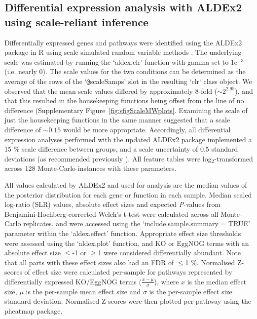 \documentclass[sn-mathphys,Numbered]{sn-jnl}%
\begin{document}
\subsection{Differential expression analysis with ALDEx2 using scale-reliant inference}
Differentially expressed genes and pathways were identified using the ALDEx2 package in R using scale simulated random variable methods \cite{fernandes:2013, gloorScale, nixon2023scale}. The underlying scale was estimated by running the `aldex.clr' function with gamma set to 1e$^{-3}$ (i.e. nearly 0). The scale values for the two conditions can be determined as the average of the rows of the `\texttt{@}scaleSamps' slot in the resulting `clr` class object. We observed that the mean scale values differed by approximately 8-fold ($\sim 2^{2.95}$), and that this resulted in the housekeeping functions being offset from the line of no difference (Supplementary Figure~\ref{fig:sfigScaleMWplots}. Examining the scale of just the housekeeping functions in the same manner suggested that a scale difference of $\sim0.15$ would be more appropriate. Accordingly, all differential expression analyses performed with the updated ALDEx2 package implemented a 15 \% scale difference between groups, and a scale uncertainty of 0.5 standard deviations (as recommended previously \citep{gloorScale, nixon2023scale}). All feature tables were log$_2$-transformed across 128 Monte-Carlo instances with these parameters.

All values calculated by ALDEx2 and used for analysis are the median values of the posterior distribution for each gene or function in each sample. Median scaled log-ratio (SLR) values, absolute effect sizes and expected \textit{P}-values from Benjamini-Hochberg-corrected Welch's t-test were calculated across all Monte-Carlo replicates. and were accessed using the `include.sample.summary = TRUE' parameter within the `aldex.effect' function. Appropriate effect size thresholds were assessed using the `aldex.plot' function, and KO or EggNOG terms with an absolute effect size $\leq$-1 or $\geq$1 were considered differentially abundant. Note that all parts with these effect sizes also had an FDR of $\leq$1 \%. Normalised Z-scores of effect size were calculated per-sample for pathways represented by differentially expressed KO/EggNOG terms ($\frac{x-\mu}{\sigma}$), where $x$ is the median effect size, $\mu$ is the per-sample mean effect size and $\sigma$ is the per-sample effect size standard deviation. Normalised Z-scores were then plotted per-pathway using the pheatmap package.
\end{document}
